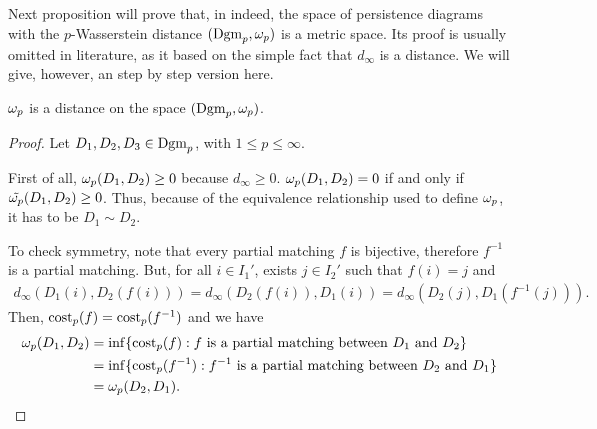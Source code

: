 Next proposition will prove that, in indeed, the space of persistence diagrams with the $p$-Wasserstein distance $(\operatorname{Dgm}_p, \omega_p)$ is a metric space. Its proof is usually omitted in literature, as it based on the simple fact that $ d_\infty $ is a distance. We will give, however, an step by step version here.

\begin{proposition}
    $\omega_p$ is a distance on the space $ (\operatorname{Dgm}_p, \omega_p) $.
\end{proposition}
\begin{proof}
    Let $ D_1, D_2, D_3 \in \operatorname{Dgm}_p$, with $ 1 \leq p \leq \infty $.

    First of all, $ \omega_p (D_1, D_2) \geq 0 $ because $ d_\infty \geq 0 $. $ \omega_p (D_1, D_2) = 0 $ if and only if $ \tilde {\omega_p} (D_1, D_2) \geq 0 $. Thus, because of the equivalence relationship used to define $ \omega_p $, it has to be $ D_1 \sim D_2 $.

    To check symmetry, note that every partial matching $ f $ is bijective, therefore $ f^{-1} $ is a partial matching. But, for all $ i \in I_1'$, exists $ j \in I_2' $ such that $ f(i) = j $ and
    \begin{align*}
        d_\infty (D_1(i), D_2(f(i))) = d_\infty (D_2(f(i)), D_1(i)) = d_\infty (D_2(j), D_1(f^{-1}(j))).
    \end{align*}
    Then, $ \operatorname{cost}_p(f) = \operatorname{cost}_p(f^{-1}) $ and we have
    \begin{align*}
        \omega_p (D_1, D_2) &= \inf \{\operatorname{cost}_p(f) : f \text{ is a partial matching between } D_1 \text{ and } D_2 \} \\
        &= \inf \{\operatorname{cost}_p(f^{-1}) : f^{-1} \text{ is a partial matching between } D_2 \text{ and } D_1 \} \\
        &= \omega_p (D_2, D_1).
    \end{align*}
    

\end{proof}

